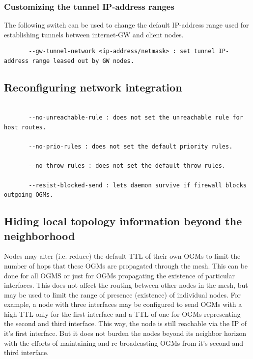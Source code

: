 \documentclass[11pt]{article}
\begin{document}
\subsubsection{Customizing the tunnel IP-address ranges}

The following switch can be used to change the default IP-address range used for establishing tunnels between internet-GW and client nodes. 

\begin{small} \begin{verbatim}
       --gw-tunnel-network <ip-address/netmask> : set tunnel IP-address range leased out by GW nodes.
\end{verbatim} \end{small}




\subsection{Reconfiguring network integration}

\begin{small} \begin{verbatim}

       --no-unreachable-rule : does not set the unreachable rule for host routes.

       --no-prio-rules : does not set the default priority rules.

       --no-throw-rules : does not set the default throw rules.

       --resist-blocked-send : lets daemon survive if firewall blocks outgoing OGMs.

\end{verbatim} \end{small}

\subsection{Hiding local topology information beyond the neighborhood}
\label{sec:hiding-topology}
Nodes may alter (i.e. reduce) the default TTL of their own OGMs to limit the number of hops that these OGMs are propagated through the mesh. 
This can be done for all OGMS or just for OGMs propagating the existence of particular interfaces. 
This does not affect the routing between other nodes in the mesh, but may be used to limit the range of presence (existence) of individual nodes. 
For example, a node with three interfaces may be configured to send OGMs with a high TTL only for the first interface and a TTL of one for OGMs representing the second and third interface. 
%
This way, the node is still reachable via the IP of it's first interface. 
But it does not burden the nodes beyond its neighbor horizon with the efforts of maintaining and re-broadcasting OGMs from it's second and third interface.
\end{document}
